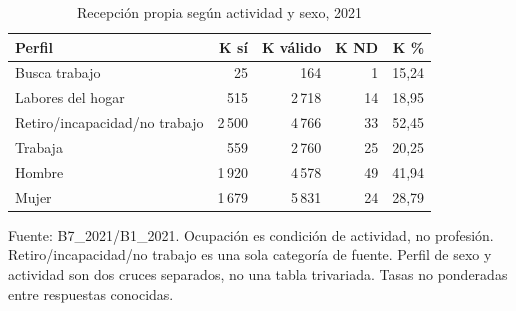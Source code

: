 \begin{table}[!htbp]
\centering
\caption{Recepción propia según actividad y sexo, 2021}\label{tab:exploracion-actividad}
\small\setlength{\tabcolsep}{4pt}
\renewcommand{\arraystretch}{1.15}
\begin{tabular}{lrrrr}
\toprule
\textbf{Perfil} & \textbf{K sí} & \textbf{K válido} & \textbf{K ND} & \textbf{K \%} \\
\midrule
Busca trabajo & 25 & 164 & 1 & 15,24 \\
Labores del hogar & 515 & 2\,718 & 14 & 18,95 \\
Retiro/incapacidad/no trabajo & 2\,500 & 4\,766 & 33 & 52,45 \\
Trabaja & 559 & 2\,760 & 25 & 20,25 \\
Hombre & 1\,920 & 4\,578 & 49 & 41,94 \\
Mujer & 1\,679 & 5\,831 & 24 & 28,79 \\
\bottomrule
\end{tabular}
\par\medskip
\parbox{\linewidth}{\footnotesize Fuente: B7\_2021/B1\_2021. Ocupación es condición de actividad, no profesión. Retiro/incapacidad/no trabajo es una sola categoría de fuente. Perfil de sexo y actividad son dos cruces separados, no una tabla trivariada. Tasas no ponderadas entre respuestas conocidas.}
\end{table}
